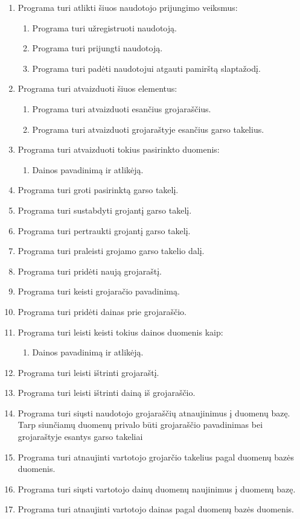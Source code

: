 \documentclass{VUMIFPSkursinis}
\begin{document}
\begin{enumerate}[start=1,label={\bfseries FR\arabic*}]
\item Programa turi atlikti šiuos naudotojo prijungimo veiksmus:
	\begin{enumerate}[start=1,label={\bfseries FR1.\arabic*}]
	\item Programa turi užregistruoti naudotoją.
	\item Programa turi prijungti naudotoją.
	\item Programa turi padėti naudotojui atgauti pamirštą slaptažodį.
	\end{enumerate}
\item Programa turi atvaizduoti šiuos elementus:
	\begin{enumerate}[start=1,label={\bfseries FR2.\arabic*}]
	\item Programa turi atvaizduoti esančius grojaraščius.
	\item Programa turi atvaizduoti grojaraštyje esančius garso takelius.
	\end{enumerate}
	\item Programa turi atvaizduoti tokius pasirinkto duomenis:
	\begin{enumerate}[start=1,label={\bfseries FR2.3.\arabic*}]
	\item Dainos pavadinimą ir atlikėją.
	\end{enumerate}
\item Programa turi groti pasirinktą garso takelį.
\item Programa turi sustabdyti grojantį garso takelį.
\item Programa turi pertraukti grojantį garso takelį.
\item Programa turi praleisti grojamo garso takelio dalį.
\item Programa turi pridėti naują grojaraštį.
\item Programa turi keisti grojaračio pavadinimą.
\item Programa turi pridėti dainas prie grojaraščio.
\item Programa turi leisti keisti tokius dainos duomenis kaip:
	\begin{enumerate}[start=1,label={\bfseries FR10.\arabic*}]
	\item Dainos pavadinimą ir atlikėją.
	\end{enumerate}
\item Programa turi leisti ištrinti grojaraštį.
\item Programa turi leisti ištrinti dainą iš grojaraščio.
\item Programa turi siųsti naudotojo grojaraščių atnaujinimus į duomenų bazę. Tarp siunčiamų duomenų privalo būti grojaraščio pavadinimas bei grojaraštyje esantys garso takeliai
\item Programa turi atnaujinti vartotojo grojarčio takelius pagal duomenų bazės duomenis.
\item Programa turi siųsti vartotojo dainų duomenų naujinimus į duomenų bazę.
\item Programa turi atnaujinti vartotojo dainas pagal duomenų bazės duomenis.
\end{enumerate}
\end{document}
